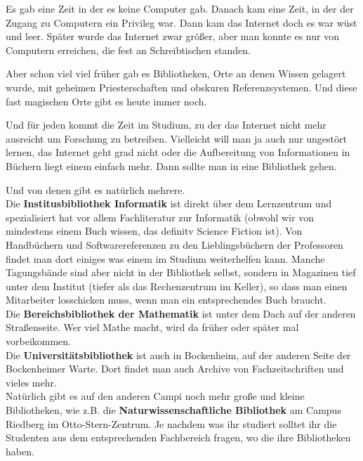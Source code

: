 \spaltenanfang

Es gab eine Zeit in der es keine Computer gab. Danach kam eine Zeit, in der der Zugang zu Computern ein Privileg war. Dann kam das Internet doch es war w\"ust und leer. Sp\"ater wurde das Internet zwar gr\"o{\ss}er, aber man konnte es nur von Computern erreichen, die fest an Schreibtischen standen.

Aber schon viel viel fr\"uher gab es Bibliotheken, Orte an denen Wissen gelagert wurde, mit geheimen Priesterschaften und obskuren Referenzsystemen. Und diese fast magischen Orte gibt es heute immer noch.

Und f\"ur jeden kommt die Zeit im Studium, zu der das Internet nicht mehr ausreicht um Forschung zu betreiben. Vielleicht will man ja auch nur ungest\"ort lernen, das Internet geht grad nicht oder die Aufbereitung von Informationen in B\"uchern liegt einem einfach mehr. Dann sollte man in eine Bibliothek gehen.

Und von denen gibt es nat\"urlich mehrere.\\
Die \textbf{Institusbibliothek Informatik} ist direkt \"uber dem Lernzentrum
und spezialisiert hat vor allem Fachliteratur zur Informatik (obwohl wir von
mindestens einem Buch wissen, das definitv Science Fiction ist). Von Handb\"uchern und
Softwarereferenzen zu den Lieblingsb\"uchern der Professoren findet man dort
einiges was einem im Studium weiterhelfen kann. Manche Tagungsb\"ande sind aber nicht in der Bibliothek selbst,
sondern in Magazinen tief unter dem Institut (tiefer als das Rechenzentrum im Keller), so dass man einen Mitarbeiter losschicken muss, wenn man ein entsprechendes Buch braucht.\\
Die \textbf{Bereichsbibliothek der Mathematik} ist unter dem Dach auf der anderen Stra{\ss}enseite. Wer viel Mathe macht, wird da fr\"uher oder sp\"ater mal vorbeikommen.\\
Die \textbf{Universit\"atsbibliothek} ist auch in Bockenheim, auf der anderen Seite der Bockenheimer Warte. Dort findet man auch Archive von Fachzeitschriften und vieles mehr.\\
Nat\"urlich gibt es auf den anderen Campi noch mehr gro{\ss}e und kleine Bibliotheken, wie z.B. die \textbf{Naturwissenschaftliche Bibliothek} am Campus Riedberg im Otto-Stern-Zentrum. Je nachdem was ihr studiert solltet ihr die Studenten aus dem entsprechenden Fachbereich fragen, wo die ihre Bibliotheken haben.

